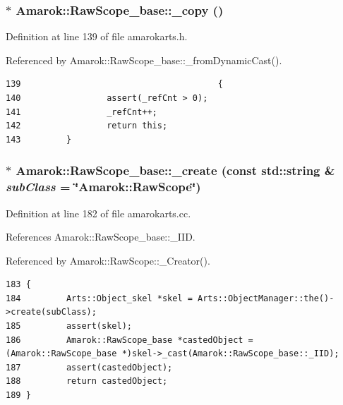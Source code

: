 \subsubsection{$\ast$ Amarok::Raw\-Scope\_\-base::\_\-copy ()\hspace{0.3cm}{\tt  [inline, inherited]}}\label{classAmarok_1_1RawScope__base_Amarok_1_1RawScope__stuba4}




Definition at line 139 of file amarokarts.h.

Referenced by Amarok::Raw\-Scope\_\-base::\_\-from\-Dynamic\-Cast().



\footnotesize\begin{verbatim}139                                       {
140                 assert(_refCnt > 0);
141                 _refCnt++;
142                 return this;
143         }
\end{verbatim}\normalsize 
{}
\subsubsection{ $\ast$ Amarok::Raw\-Scope\_\-base::\_\-create (const std::string \& {\em sub\-Class} = \char`\"{}Amarok::Raw\-Scope\char`\"{})\hspace{0.3cm}{\tt  [static, inherited]}}\label{classAmarok_1_1RawScope__base_Amarok_1_1RawScope__stube0}




Definition at line 182 of file amarokarts.cc.

References Amarok::Raw\-Scope\_\-base::\_\-IID.

Referenced by Amarok::Raw\-Scope::\_\-Creator().



\footnotesize\begin{verbatim}183 {
184         Arts::Object_skel *skel = Arts::ObjectManager::the()->create(subClass);
185         assert(skel);
186         Amarok::RawScope_base *castedObject = (Amarok::RawScope_base *)skel->_cast(Amarok::RawScope_base::_IID);
187         assert(castedObject);
188         return castedObject;
189 }
\end{verbatim}\normalsize 
{}

